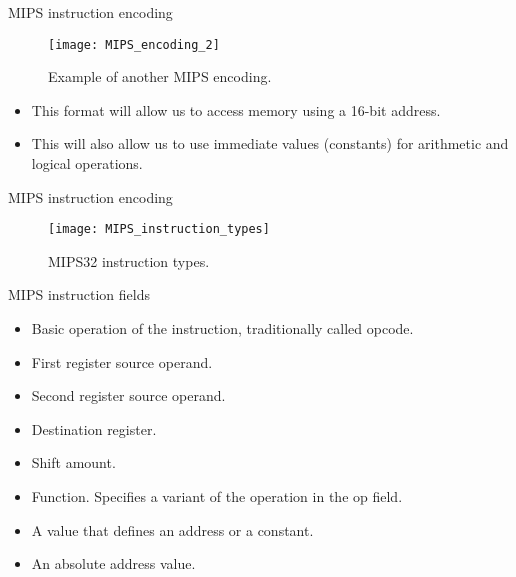 % 
\begin{frame}{\acs{MIPS} instruction encoding}
  \begin{figure}
  \centering
  \texttt{[image: MIPS\_encoding\_2]}
  \caption{Example of another \acs{MIPS} encoding.}
  \label{Figure:MIPS32_encoding_2}
  \end{figure}
  \begin{itemize}
  \item This format will allow us to access memory using a 16-bit address.
  \item This will also allow us to use immediate values (constants) for arithmetic and logical operations.
  \end{itemize}
\end{frame}

% 
\begin{frame}{\acs{MIPS} instruction encoding}
  \begin{figure}
  \centering
  \texttt{[image: MIPS\_instruction\_types]}
  \caption{\acs{MIPS}32 instruction types.}
  \label{Figure:MIPS32_instruction_types}
  \end{figure}
\end{frame}

% 
\begin{frame}{\ac{MIPS} instruction fields}
  \begin{itemize}
  \item {} Basic operation of the instruction, traditionally called \alert{opcode}.
  \item {} First register source operand.
  \item {} Second register source operand.
  \item {} Destination register.
  \item {} Shift amount.
  \item {} Function. Specifies a variant of the operation in the op field.
  \item {} A value that defines an address or a constant.
  \item {} An absolute address value.
  \end{itemize}
\end{frame}

